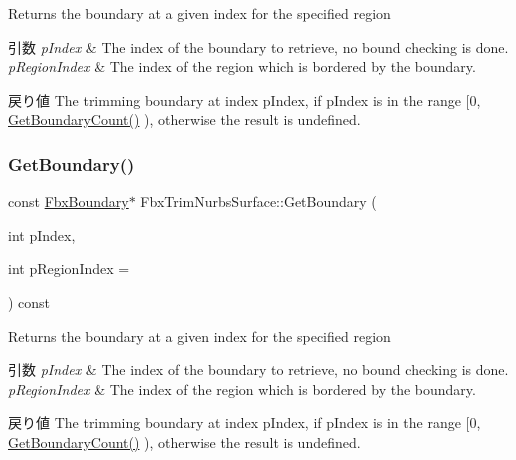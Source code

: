 Returns the boundary at a given index for the specified region 
\begin{DoxyParams}{引数}
{\em p\+Index} & The index of the boundary to retrieve, no bound checking is done. \\
\hline
{\em p\+Region\+Index} & The index of the region which is bordered by the boundary. \\
\hline
\end{DoxyParams}
\begin{DoxyReturn}{戻り値}
The trimming boundary at index p\+Index, if p\+Index is in the range \mbox{[}0, \hyperlink{class_fbx_trim_nurbs_surface_a95faf8ef0f87e4a329a7a7c0340dbd99}{Get\+Boundary\+Count()} ), otherwise the result is undefined. 
\end{DoxyReturn}
\mbox{\label{class_fbx_trim_nurbs_surface_a64eb1c82eb77f8e48a7da4ecea7c1f81}} 
\subsubsection{\texorpdfstring{Get\+Boundary()}{GetBoundary()}\hspace{0.1cm}{\footnotesize\ttfamily [2/2]}}
{\footnotesize\ttfamily const \hyperlink{class_fbx_boundary}{Fbx\+Boundary}$\ast$ Fbx\+Trim\+Nurbs\+Surface\+::\+Get\+Boundary (\begin{DoxyParamCaption}\item[{int}]{p\+Index,  }\item[{int}]{p\+Region\+Index = {} }\end{DoxyParamCaption}) const}

Returns the boundary at a given index for the specified region 
\begin{DoxyParams}{引数}
{\em p\+Index} & The index of the boundary to retrieve, no bound checking is done. \\
\hline
{\em p\+Region\+Index} & The index of the region which is bordered by the boundary. \\
\hline
\end{DoxyParams}
\begin{DoxyReturn}{戻り値}
The trimming boundary at index p\+Index, if p\+Index is in the range \mbox{[}0, \hyperlink{class_fbx_trim_nurbs_surface_a95faf8ef0f87e4a329a7a7c0340dbd99}{Get\+Boundary\+Count()} ), otherwise the result is undefined. 
\end{DoxyReturn}
\mbox{\label{class_fbx_trim_nurbs_surface_a95faf8ef0f87e4a329a7a7c0340dbd99}} 
